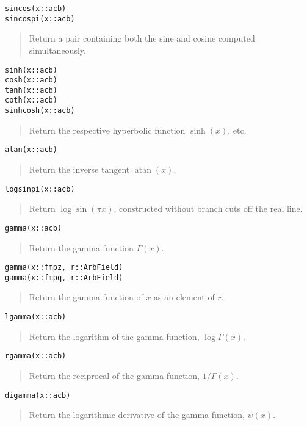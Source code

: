\documentclass[a4paper,10pt]{article}
\newcommand{\desc}[1]{\vspace{-3mm}\begin{quote}#1\end{quote}}
\begin{document}
{{\begin{lstlisting}
sincos(x::acb)
sincospi(x::acb)
\end{lstlisting}

\desc{Return a pair containing both the sine and cosine computed simultaneously.}

\begin{lstlisting}
sinh(x::acb)
cosh(x::acb)
tanh(x::acb)
coth(x::acb)
sinhcosh(x::acb)
\end{lstlisting}

\desc{Return the respective hyperbolic function $\sinh(x)$, etc.}

\begin{lstlisting}
atan(x::acb)
\end{lstlisting}

\desc{Return the inverse tangent $\operatorname{atan}(x)$.}

\begin{lstlisting}
logsinpi(x::acb)
\end{lstlisting}

\desc{Return $\log\sin(\pi x)$, constructed without branch cuts off the real line.}

\begin{lstlisting}
gamma(x::acb)
\end{lstlisting}

\desc{Return the gamma function $\Gamma(x)$.}

\begin{lstlisting}
gamma(x::fmpz, r::ArbField)
gamma(x::fmpq, r::ArbField)
\end{lstlisting}

\desc{Return the gamma function of $x$ as an element of $r$.}

\begin{lstlisting}
lgamma(x::acb)
\end{lstlisting}

\desc{Return the logarithm of the gamma function, $\log \Gamma(x)$.}

\begin{lstlisting}
rgamma(x::acb)
\end{lstlisting}

\desc{Return the reciprocal of the gamma function, $1 / \Gamma(x)$.}

\begin{lstlisting}
digamma(x::acb)
\end{lstlisting}

\desc{Return the logarithmic derivative of the gamma function, $\psi(x)$.}

}}
\end{document}
